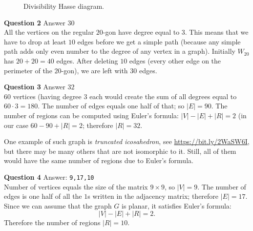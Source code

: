 \documentclass[jou]{apa6}
\begin{document}
\begin{figure}[!htb]
\caption{\label{fig:divisibility-144-graph} Divisibility Hasse diagram.}
\end{figure}




\vspace{10pt}
{\bf Question 2} Answer $30$\\
All the vertices on the regular $20$-gon have degree equal to $3$. 
This means that we have to drop at least $10$ edges before we 
get a simple path (because any simple path adds only even number to the degree
of any vertex in a graph). Initially $W_{20}$ has $20 + 20 = 40$ edges. 
After deleting $10$ edges (every other edge on the perimeter of the $20$-gon), 
we are left with $30$ edges.


\vspace{10pt}
{\bf Question 3} Answer $32$\\
$60$ vertices (having degree $3$ each would create the sum of all degrees equal to $60 \cdot 3 = 180$. 
The number of edges equals one half of that; so $|E| = 90$. The number of regions
can be computed using Euler's formula: $|V| - |E| + |R| = 2$ (in our case 
$60 - 90 + |R| = 2$; therefore $|R| = 32$. 

One example of such graph is {\em truncated icosahedron}, see \url{https://bit.ly/2WaSW6I}, 
but there may be many others that are not isomorphic to it. Still, all of them 
would have the same number of regions due to Euler's formula.

\vspace{10pt}
{\bf Question 4} Answer: {\tt 9,17,10}\\
Number of vertices equals the size of the matrix $9 \times 9$, 
so $|V| = 9$. The number of edges is one half of all the $1$s written 
in the adjacency matrix; therefore $|E| = 17$. Since we can assume
that the graph $G$ is planar, it satisfies Euler's formula:
$$|V| - |E| + |R| = 2.$$
Therefore the number of regions $|R| = 10$. 
\end{document}
